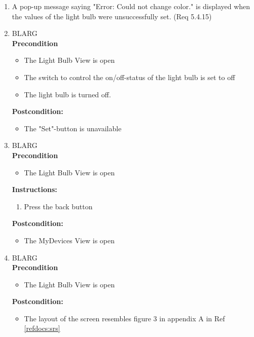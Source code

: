 \documentclass[a4paper]{article}
\newlength{\testlabellength}
\newenvironment{testlist}{\begin{enumerate}[label=\bfseries Instruction \thesubsection.\arabic* , labelindent=0pt, labelwidth=\testlabellength , leftmargin=2cm]}{\end{enumerate}}
\newenvironment{precondition}{
{\color{white}BLARG}\\ 
\textbf{Precondition}
\begin{itemize}[labelindent=0cm, labelwidth=2cm , leftmargin=1cm]
}
{\end{itemize}}
\newenvironment{instruction}{
\textbf{Instructions:}
\begin{enumerate}[label=\bfseries  \arabic*., labelindent=0cm, labelwidth=2cm , leftmargin=1cm]
}
{\end{enumerate}}
\newenvironment{postcondition}{
\textbf{Postcondition:}
\begin{itemize}[labelindent=0cm, labelwidth=2cm , leftmargin=1cm]
}
{\end{itemize}}
\begin{document}
\begin{appendices}
\begin{testlist}
    \item A pop-up message saying "Error: Could not change color." is displayed when the values of the light bulb were unsuccessfully set. (Req 5.4.15)

	\item
		\begin{precondition}
			\item The Light Bulb View is open
			\item The switch to control the on/off-status of the light bulb is set to off
			\item The light bulb is turned off.
		\end{precondition}
		\begin{postcondition}
			\item The "Set"-button is unavailable
		\end{postcondition}

	\item
		\begin{precondition}
			\item The Light Bulb View is open
		\end{precondition}
		\begin{instruction}
			\item Press the back button
		\end{instruction}
		\begin{postcondition}
			\item The MyDevices View is open
		\end{postcondition}
    
	\item
		\begin{precondition}
			\item The Light Bulb View is open
		\end{precondition}
		\begin{postcondition}
			\item The layout of the screen resembles figure 3 in appendix A in Ref \ref{refdocs:srs}
		\end{postcondition}


\end{testlist}
\end{appendices}
\end{document}
